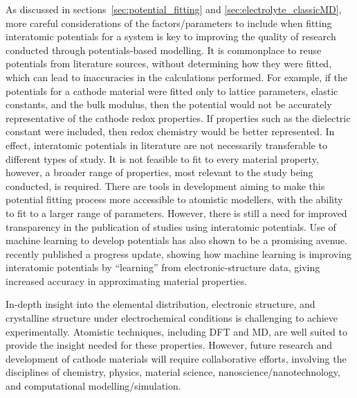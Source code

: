 \documentclass[../main.tex]{subfiles}
\begin{document}
As discussed in sections~\ref{sec:potential_fitting} and \ref{sec:electrolyte_classicMD}, more careful considerations of the factors/parameters to include when fitting interatomic potentials for a system is key to improving the quality of research conducted through potentials-based modelling. It is commonplace to reuse potentials from literature sources, without determining how they were fitted, which can lead to inaccuracies in the calculations performed. For example, if the potentials for a cathode material were fitted only to lattice parameters, elastic constants, and the bulk modulus, then the potential would not be accurately representative of the cathode redox properties. If properties such as the dielectric constant were included, then redox chemistry would be better represented. In effect, interatomic potentials in literature are not necessarily transferable to different types of study. It is not feasible to fit to every material property, however, a broader range of properties, most relevant to the study being conducted, is required. There are tools in development \cite{gale_empirical_1996, Stukowski_2017, wen_kim-compliant_2017, Morgan2021PopOff} aiming to make this potential fitting process more accessible to atomistic modellers, with the ability to fit to a larger range of parameters. However, there is still a need for improved transparency in the publication of studies using interatomic potentials. Use of machine learning to develop potentials has also shown to be a promising avenue. \citeauthor{deringer2019machine} recently published a progress update, showing how machine learning is improving interatomic potentials by ``learning'' from electronic-structure data, giving increased accuracy in approximating material properties.\cite{deringer2019machine}

In-depth insight into the elemental distribution, electronic structure, and crystalline structure under electrochemical conditions is challenging to achieve experimentally. Atomistic techniques, including DFT and MD, are well suited to provide the insight needed for these properties. However, future research and development of cathode materials will require collaborative efforts, involving the disciplines of chemistry, physics, material science, nanoscience/nanotechnology, and computational modelling/simulation.\cite{yu2018electrode}
\end{document}
